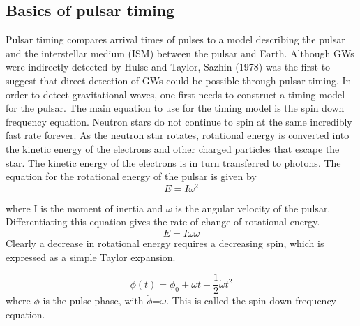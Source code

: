 \documentclass[12pt]{article}
\begin{document}
	\subsection{Basics of pulsar timing}\label{Timing model}
	
	Pulsar timing compares arrival times of pulses to a model describing the pulsar and the interstellar medium (ISM) between the pulsar and Earth. Although GWs were indirectly detected by Hulse and Taylor, Sazhin (1978) was the ﬁrst to suggest that direct detection of GWs could be possible through pulsar timing. In order to detect gravitational waves, one first needs to construct a timing model for the pulsar. The main equation to use for the timing model is the spin down frequency equation. Neutron stars do not continue to spin at the same incredibly fast rate forever. As the neutron star rotates, rotational energy is converted into the kinetic energy of the electrons and other charged particles that escape the star. The kinetic energy of the electrons is in turn transferred to photons. The equation for the rotational energy of the pulsar is given by
	\begin{equation}\label{rotational energy}
	E=I \omega^2
	\end{equation}
	
	where I is the moment of inertia and $\omega$ is the angular velocity of the pulsar. Differentiating this equation gives the rate of change of rotational energy.
	\begin{equation}\label{rotational energy derivative}
	E=I \omega \dot{\omega}
	\end{equation}
	Clearly a decrease in rotational energy requires a decreasing spin, which is expressed as a simple Taylor expansion.
	
	\begin{equation}\label{spin down frequency equation}
	\phi(t)=\phi_0+\omega t +\frac{1}{2}\dot{\omega} t^2
	\end{equation}
	where $\phi$ is the pulse phase, with $\dot{\phi}$=${\omega}$. This is called the spin down frequency equation.\\
	
\end{document}
